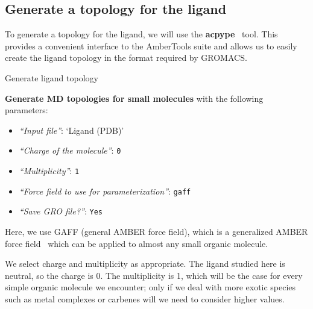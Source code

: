 \documentclass[twocolumn]{bmcart}%
\providecommand{\tightlist}{%
  \setlength{\itemsep}{0pt}\setlength{\parskip}{0pt}}
\begin{document}
\subsection*{Generate a topology for the
ligand}\label{generate-a-topology-for-the-ligand}

To generate a topology for the ligand, we will use the \textbf{acpype}~\cite{SousadaSilva2012}
tool. This provides a convenient interface to the AmberTools suite and
allows us to easily create the ligand topology in the format required by
GROMACS.

\begin{handson_box_colour}{Generate ligand topology}

  \textbf{Generate MD topologies for small molecules} with the following
  parameters:

  \begin{itemize}
  \tightlist
  \item
    \emph{``Input file''}: `Ligand (PDB)'
  \item
    \emph{``Charge of the molecule''}: \texttt{0}
  \item
    \emph{``Multiplicity''}: \texttt{1}
  \item
    \emph{``Force field to use for parameterization''}:
    \texttt{gaff}
  \item
    \emph{``Save GRO file?''}: \texttt{Yes}
  \end{itemize}

\end{handson_box_colour}

Here, we use GAFF (general AMBER force field), which is a generalized AMBER force field~\cite{Wang2004} which can be applied to almost any small organic molecule.

We select charge and multiplicity as appropriate. The ligand studied here is neutral, so the charge is 0. The multiplicity is 1, which will be the case for every simple organic molecule we encounter; only if we deal with more exotic species such as metal complexes or carbenes will we need to consider higher values.

\end{document}
